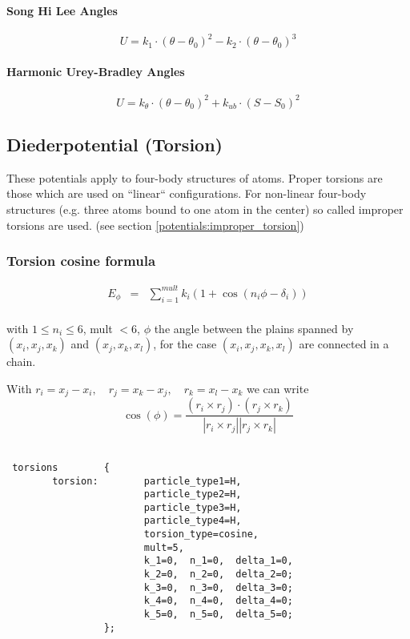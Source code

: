 \paragraph{Song Hi Lee Angles}
\begin{equation*}
U = k_1\cdot(\theta-\theta_0)^2 - k_2\cdot(\theta-\theta_0)^3
\end{equation*}
\paragraph{Harmonic Urey-Bradley Angles}
\begin{equation*}
U = k_\theta\cdot(\theta-\theta_0)^2 + k_{ub}\cdot(S-S_0)^2
\end{equation*}

\subsection{Diederpotential (Torsion)} \label{potentials:torsion}

These potentials apply to four-body structures of atoms. Proper torsions are those
which are used on ``linear`` configurations.
For non-linear four-body structures (e.g. three atoms bound to one atom in the center)
so called improper torsions are used. (see section \ref{potentials:improper_torsion})

\subsubsection{Torsion cosine formula}
\begin{eqnarray*}
E_{\phi} &=&\sum_{i=1}^{mult} k_i ( 1 + \cos (n_i \phi - \delta_i )) \\
\end{eqnarray*}

with $1 \le n_i \le 6$, mult $< 6$, $\phi$ the angle between the plains spanned by
$(x_i, x_j, x_k)$ and $(x_j, x_k, x_l)$, for the case $(x_i, x_j, x_k, x_l)$ are
connected in a chain.

With $r_i = x_j - x_i, \quad r_j = x_k - x_j, \quad r_k = x_l - x_k$ we can write
\[
\cos (\phi) =
  \frac{ ( r_i \times r_j ) \cdot ( r_j \times r_k) }
     { | r_i \times r_j | | r_j  \times r_k | }
\]
\\

\bigbreak

\begin{lstlisting}
 torsions        {
        torsion:        particle_type1=H,
                        particle_type2=H,
                        particle_type3=H,
                        particle_type4=H,
                        torsion_type=cosine,
                        mult=5,
                        k_1=0,  n_1=0,  delta_1=0,
                        k_2=0,  n_2=0,  delta_2=0;
                        k_3=0,  n_3=0,  delta_3=0;
                        k_4=0,  n_4=0,  delta_4=0;
                        k_5=0,  n_5=0,  delta_5=0;
                 };
\end{lstlisting}

